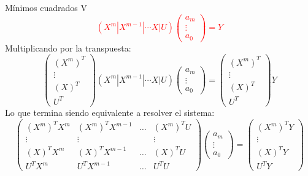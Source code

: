 \begin{frame}{Mínimos cuadrados V}
\textcolor{red}{
\begin{displaymath}
(X^m|X^{m-1}|\cdots X|U)
\left(
\begin{array}{c}
a_m\\
\vdots\\
a_0
\end{array}
\right)=Y
\end{displaymath}
}
\indent Multiplicando por la transpuesta:
\begin{displaymath}
\left(
\begin{array}{c}
(X^m)^T\\
\vdots\\
(X)^T\\
U^T
\end{array}
\right)
(X^m|X^{m-1}|\cdots X|U)
\left(
\begin{array}{c}
a_m\\
\vdots\\
a_0
\end{array}
\right)=
\left(
\begin{array}{c}
(X^m)^T\\
\vdots\\
(X)^T\\
U^T
\end{array}
\right)
Y
\end{displaymath}
Lo que termina siendo equivalente a resolver el sistema:
\begin{displaymath}
\left(
\begin{array}{cccc}
(X^m)^TX^m & (X^m)^TX^{m-1} &\hdots & (X^m)^TU\\
\vdots&\vdots &&\vdots\\
(X)^TX^m&(X)^TX^{m-1}&\hdots &(X)^TU\\
U^TX^m&U^TX^{m-1}&\hdots &U^TU
\end{array}
\right)
\left(
\begin{array}{c}
a_m\\
\vdots\\
a_0
\end{array}
\right)=
\left(
\begin{array}{c}
(X^m)^TY\\
\vdots\\
(X)^TY\\
U^TY
\end{array}
\right)
\end{displaymath}
\end{frame}
